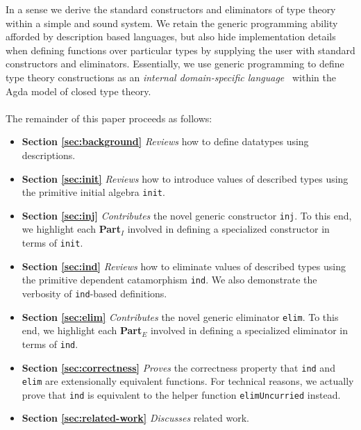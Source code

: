 \documentclass[nonatbib]{sigplanconf}
\newcommand{\refsec}[1]{Section \ref{sec:#1}}
\begin{document}
In a sense we derive the standard constructors and
eliminators of type theory within a simple and sound system.
We retain the generic programming ability afforded by description based languages,
but also hide implementation details when defining functions over
particular types by supplying the user with standard constructors and
eliminators. Essentially, we use generic programming to define type
theory constructions as an
{\it internal domain-specific language}~\citep{landin1966next} within the
{\sc Agda} model of closed type theory.

\paragraph{}
The remainder of this paper proceeds as follows:

\begin{itemize}
\item{\bf{\refsec{background}}}
{\it Reviews} how to define datatypes using descriptions.

\item{\bf{\refsec{init}}}
{\it Reviews} how to introduce values of described types using the
primitive initial algebra {\tt init}.

\item{\bf{\refsec{inj}}}
{\it Contributes} the novel generic constructor {\tt inj}. To this
end, we highlight each {\bf Part$_I$} involved in defining a specialized
constructor in terms of {\tt init}.

\item{\bf{\refsec{ind}}}
{\it Reviews} how to eliminate values of described types using the
primitive dependent catamorphism {\tt ind}. We also demonstrate
the verbosity of {\tt ind}-based definitions.

\item{\bf{\refsec{elim}}}
{\it Contributes} the novel generic eliminator {\tt elim}. To this
end, we highlight each {\bf Part$_E$} involved in defining a specialized
eliminator in terms of {\tt ind}.

\item{\bf{\refsec{correctness}}}
{\it Proves} the correctness property that {\tt ind} and {\tt elim}
are extensionally equivalent functions. For technical reasons, we actually prove that
{\tt ind} is equivalent to the helper function {\tt elimUncurried} instead.

\item{\bf{\refsec{related-work}}}
{\it Discusses} related work.

\end{itemize}
\end{document}
